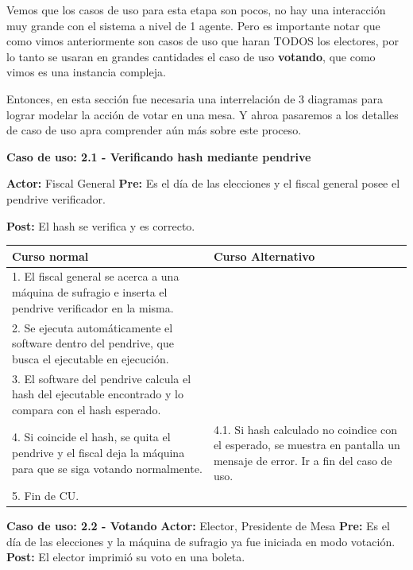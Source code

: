 Vemos que los casos de uso para esta etapa son pocos, no hay una interacción muy grande con el sistema a nivel de 1 agente. Pero es importante notar que como vimos anteriormente son casos de uso que haran TODOS los electores, por lo tanto se usaran en grandes cantidades el caso de uso \textbf{votando}, que como vimos es una instancia compleja.

Entonces, en esta sección fue necesaria una interrelación de 3 diagramas para lograr modelar la acción de votar en una mesa. Y ahroa pasaremos a los detalles de caso de uso apra comprender aún más sobre este proceso.



\textbf{Caso de uso: 2.1 - Verificando hash mediante pendrive}

\textbf{Actor:} Fiscal General
\textbf{Pre:} Es el día de las elecciones y el fiscal general posee el pendrive verificador.

\textbf{Post:} El hash se verifica y es correcto.

\begin{table}[h!]
	
 \begin{tabular}{|p{7.5cm} | p{7.5cm}|} 
 \hline
 \textbf{Curso normal} & \textbf{Curso Alternativo} \\
 \hline
	

1. El fiscal general se acerca a una máquina de sufragio e inserta el pendrive verificador en la misma. & \\
 \hline
2. Se ejecuta automáticamente el software dentro del pendrive, que busca el ejecutable en ejecución.& \\


3. El software del pendrive calcula el hash del ejecutable encontrado y lo compara con el hash esperado. & \\
\hline

4. Si coincide el hash, se quita el pendrive y el fiscal deja la máquina para que se siga votando normalmente. &
4.1. Si hash calculado no coindice con el esperado, se muestra en pantalla un mensaje de error. Ir a fin del caso de uso. \\
\hline
5. Fin de CU. & \\
\hline
\end{tabular}
\end{table}

\textbf{Caso de uso: 2.2 - Votando}
\textbf{Actor:} Elector, Presidente de Mesa
\textbf{Pre:} Es el día de las elecciones y la máquina de sufragio ya fue iniciada en modo votación.
\textbf{Post:} El elector imprimió su voto en una boleta.

